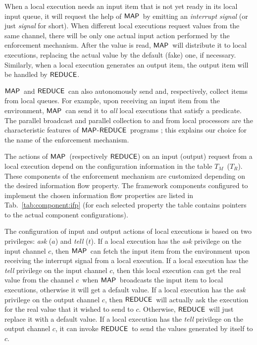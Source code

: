 \documentclass[10pt,a4paper,oneside]{article}
\def\TAV{\ensuremath{T_{M}}}
\def\TPV{\ensuremath{T_{R}}}
\def\chnl{\ensuremath{c}}
\def\sanserif#1{\ensuremath{\sf #1}}
\def\REDUCE{\ensuremath{\sanserif{REDUCE}}}
\def\MAP{\ensuremath{\sanserif{MAP}}}
\def\task{\ensuremath{a}}
\def\ttell{\ensuremath{t}}
\begin{document}
When a local execution needs an input item that is not yet ready in its local input queue, it will request the help of \MAP\ by emitting an \emph{interrupt signal} (or just \emph{signal} for short). When different local executions request values from the same channel, there will be only one actual input action performed by the enforcement mechanism. After the value is read, \MAP\ will distribute it to local executions, replacing the actual value by the default (fake) one, if necessary. Similarly, when a local execution generates an output item, the output item will be handled by \REDUCE.

\MAP\ and \REDUCE\ can also autonomously send and, respectively, collect items from local queues. For example, upon receiving an input item from the environment, \MAP\ can send it to \emph{all} local executions that satisfy a predicate. The parallel broadcast and parallel collection to and from local processors are the characteristic features of \MAP-\REDUCE\ programs \cite{Lamm-07}; this explains our choice for the name of the enforcement mechanism.

The actions of \MAP\ (respectively \REDUCE) on an input (output) request from a local execution depend on the configuration information in the table \TAV\ (\TPV). These components of the enforcement mechanism are customized depending on the desired information flow property. The framework components configured to implement the chosen information flow properties are listed in Tab.~\ref{tab:component:ifp} (for each selected property the table contains pointers to the actual component configurations).

The configuration of input and output actions of local executions is based on two privileges: \emph{ask} (\task) and \emph{tell} (\ttell). If a local execution has the \emph{ask} privilege on the input channel \chnl, then \MAP\ can fetch the input item from the environment upon receiving the interrupt signal from a local execution. If a local execution has the \emph{tell} privilege on the input channel \chnl, then this local execution can get the real value from the channel \chnl\ when \MAP\ broadcasts the input item to local executions, otherwise it will get a default value. If a local execution has the \emph{ask} privilege on the output channel \chnl, then \REDUCE\ will actually ask the execution for the real value that it wished to send to \chnl. Otherwise, \REDUCE\ will just replace it with a default value. If a local execution has the \emph{tell} privilege on the output channel \chnl, it can invoke \REDUCE\ to send the values generated by itself to \chnl.
\end{document}
